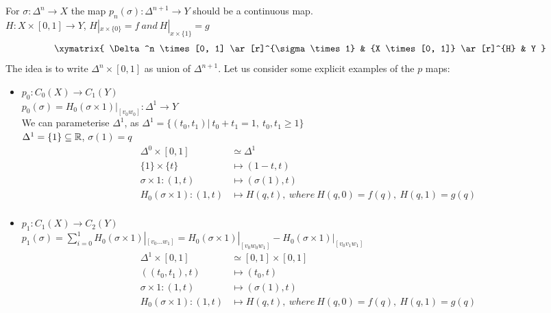 \documentclass[11pt,a4paper]{report}
\begin{document}
        For $\sigma: \Delta^n \rightarrow X$ the map $p_n(\sigma): \Delta^{n+1} \rightarrow Y$ should be a continuous map. \\
        $H: X \times [0, 1] \rightarrow Y$, $H|_{x \times \{0\}} = f \ and \ H|_{x \times \{1\}} = g $
        \[
         \xymatrix{
                        \Delta^n \times[0, 1] \ar[r]^{\sigma \times 1} &
                        {X \times [0, 1]} \ar[r]^{H} & Y  }
        \]
        The idea is to write $\Delta^n \times[0, 1]$ as union of $\Delta^{n+1}$.
        Let us consider some explicit examples of the $p$ maps:
        \begin{itemize}
         \item $p_0: C_0(X) \rightarrow C_1(Y)$ \\
         $p_0(\sigma) = H_0(\sigma \times 1) |_{[v_0w_0]}: \Delta^1 \rightarrow Y$ \\
         We can parameterise $\Delta^1$, as $\Delta^1 = \{ (t_0, t_1) | \ t_0 + t_1 = 1, \ t_0, t_1 \geq 1 \}$ \\
         $\Delta^1 = \{1\} \subseteq \mathbb{R}$, $\sigma(1) = q$ \\
         \begin{align*}
             \Delta^0 \times [0, 1] &\simeq \Delta^{1} \\
             \{1\} \times \{t\} &\mapsto (1-t, t) \\
             \sigma \times 1: (1, t) &\mapsto (\sigma(1), t) \\
            H_0( \sigma \times 1): (1, t) &\mapsto H(q, t), \ where \ H(q, 0) = f(q), \  H(q, 1) = g(q)\\
         \end{align*}
         \item $p_1: C_1(X) \rightarrow C_2(Y)$ \\
         $p_1(\sigma) = \sum_{i = 0}^1 H_0(\sigma \times 1) |_{[v_0 ... w_1]} = H_0(\sigma \times 1) |_{[v_0 w_0 w_1]} - H_0(\sigma \times 1) |_{[v_0 v_1 w_1]}$ \\
         \begin{align*}
             \Delta^1 \times [0, 1] &\simeq [0, 1] \times [0, 1] \\
             ((t_0, t_1), t) &\mapsto (t_0, t) \\
             \sigma \times 1: (1, t) &\mapsto (\sigma(1), t) \\
            H_0( \sigma \times 1): (1, t) &\mapsto H(q, t), \ where \ H(q, 0) = f(q), \  H(q, 1) = g(q)\\
         \end{align*}

\end{itemize}
\end{document}
